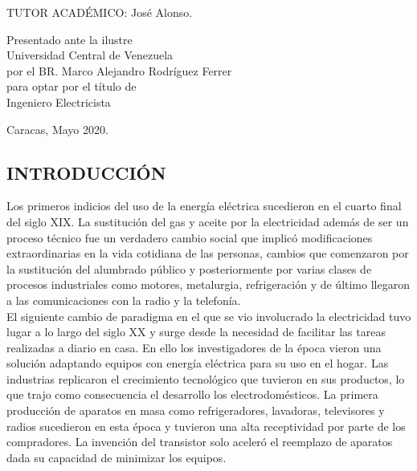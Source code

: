 \documentclass[12pt,letterpaper]{article}
\begin{document}
\begin{flushleft}
	TUTOR ACADÉMICO: José Alonso. \\
	
\end{flushleft}


\begin{flushright}
	
	
	Presentado ante la ilustre\\
	Universidad Central de Venezuela\\
	por el BR. Marco Alejandro Rodríguez Ferrer\\
	para optar por el título de \\
	Ingeniero Electricista   \\
	
	
	
\end{flushright}


\vspace{1cm}
\begin{center}
	
Caracas, Mayo 2020.
\end{center}
\thispagestyle{empty}
\newpage


\begin{center}
	\section*{ INTRODUCCIÓN}
\end{center}
\vspace{0.3cm}

Los primeros indicios del uso de la energía eléctrica sucedieron en el cuarto final del siglo XIX. La sustitución del gas y aceite por la electricidad además de ser un proceso técnico fue un verdadero cambio social que implicó modificaciones extraordinarias en la vida cotidiana de las personas, cambios que comenzaron por la sustitución del alumbrado público y posteriormente por varias clases de procesos industriales como motores, metalurgia, refrigeración y de último llegaron a las comunicaciones con la radio y la telefonía.\\

El siguiente cambio de paradigma en el que se vio involucrado la electricidad tuvo lugar a lo largo del siglo XX y surge desde la necesidad de facilitar las tareas realizadas a diario en casa. En ello los investigadores de la época vieron una solución adaptando equipos con energía eléctrica para su uso en el hogar. Las industrias replicaron el crecimiento tecnológico que tuvieron en sus productos, lo que trajo como consecuencia el desarrollo los electrodomésticos. La primera producción de aparatos en masa como refrigeradores, lavadoras, televisores y radios sucedieron en esta época y tuvieron una alta receptividad por parte de los compradores. La invención del transistor solo aceleró el reemplazo de aparatos dada su capacidad de minimizar los equipos.\\
\end{document}
